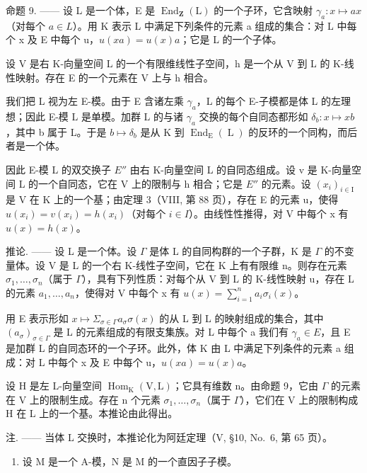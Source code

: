 命题 9. —— 设 L 是一个体，E 是 \(\operatorname{End}_{\mathbf{Z}}(\mathrm{L})\) 的一个子环，它含映射 \(\gamma_{a}: x \mapsto ax\)（对每个 \(a \in L\)）。用 K 表示 L 中满足下列条件的元素 a 组成的集合：对 L 中每个 x 及 E 中每个 u，\(u(xa) = u(x)a\)；它是 L 的一个子体。

设 V 是右 K-向量空间 L 的一个有限维线性子空间，h 是一个从 V 到 L 的 K-线性映射。存在 E 的一个元素在 V 上与 h 相合。

我们把 L 视为左 E-模。由于 E 含诸左乘 \(\gamma_{a}\)，L 的每个 E-子模都是体 L 的左理想；因此 E-模 L 是单模。加群 L 的与诸 \(\gamma_{a}\) 交换的每个自同态都形如 \(\delta_{b}: x \mapsto xb\)，其中 b 属于 L。于是 \(b \mapsto \delta_{b}\) 是从 K 到 \(\operatorname{End}_{\operatorname{E}}(\operatorname{L})\) 的反环的一个同构，而后者是一个体。

因此 E-模 L 的双交换子 \(E''\) 由右 K-向量空间 L 的自同态组成。设 v 是 K-向量空间 L 的一个自同态，它在 V 上的限制与 h 相合；它是 \(E''\) 的元素。设 \((x_{i})_{i\in\mathrm{I}}\) 是 V 在 K 上的一个基；由定理 3（VIII, 第 88 页），存在 E 的元素 u，使得 \(u(x_{i}) = v(x_{i}) = h(x_{i})\)（对每个 \(i \in I\)）。由线性性推得，对 V 中每个 x 有 \(u(x) = h(x)\)。

推论. —— 设 L 是一个体。设 \(\Gamma\) 是体 L 的自同构群的一个子群，K 是 \(\Gamma\) 的不变量体。设 V 是 L 的一个右 K-线性子空间，它在 K 上有有限维 n。则存在元素 \(\sigma_{1},\ldots,\sigma_{n}\)（属于 \(\Gamma\)），具有下列性质：对每个从 V 到 L 的 K-线性映射 u，存在 L 的元素 \(a_{1},\ldots,a_{n}\)，使得对 V 中每个 x 有 \(u(x)=\sum_{i=1}^{n}a_{i}\sigma_{i}(x)\)。

用 E 表示形如 \(x \mapsto \Sigma_{\sigma \in \Gamma} a_{\sigma} \sigma(x)\) 的从 L 到 L 的映射组成的集合，其中 \((a_{\sigma})_{\sigma \in \Gamma}\) 是 L 的元素组成的有限支集族。对 L 中每个 a 我们有 \(\gamma_{a} \in E\)，且 E 是加群 L 的自同态环的一个子环。此外，体 K 由 L 中满足下列条件的元素 a 组成：对 L 中每个 x 及 E 中每个 u，\(u(xa) = u(x)a\)。

设 H 是左 L-向量空间 \(\operatorname{Hom}_{\mathrm{K}}(\mathrm{V},\mathrm{L})\)；它具有维数 n。由命题 9，它由 \(\Gamma\) 的元素在 V 上的限制生成。存在 n 个元素 \(\sigma_{1},\ldots,\sigma_{n}\)（属于 \(\Gamma\)），它们在 V 上的限制构成 H 在 L 上的一个基。本推论由此得出。

注. —— 当体 L 交换时，本推论化为阿廷定理（V, §10, No.~6, 第 65 页）。


\begin{enumerate}
\def\labelenumi{\arabic{enumi})}
\tightlist
\item
  设 M 是一个 A-模，N 是 M 的一个直因子子模。
\end{enumerate}

